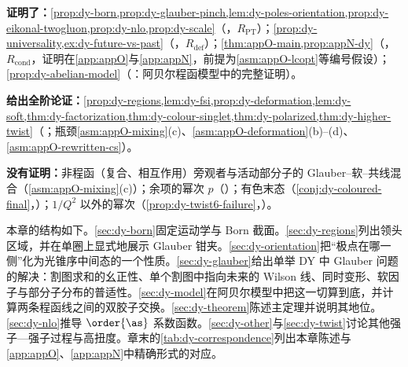 \begin{tcolorbox}[enhanced,breakable,title=本章证明了什么／没有证明什么,fonttitle=\bfseries,
  colback=gray!3!white,colframe=gray!55!black,boxrule=0.6pt,arc=2pt,
  left=5pt,right=5pt,top=3pt,bottom=3pt,before skip=6pt,after skip=6pt]
\textbf{证明了：}\cref{prop:dy-born,prop:dy-glauber-pinch,lem:dy-poles-orientation,prop:dy-eikonal-twogluon,prop:dy-nlo,prop:dy-scale}（\tagR，$R_{\mathrm{PT}}$）；\cref{prop:dy-universality,ex:dy-future-vs-past}（\tagR，$R_{\mathrm{def}}$）；\cref{thm:appO-main,prop:appN-dy}（\tagR，$R_{\mathrm{cond}}$，证明在\cref{app:appO}与\cref{app:appN}，前提为\cref{asm:appO-lcopt}等编号假设）；\cref{prop:dy-abelian-model}（\tagP：阿贝尔程函模型中的完整证明）。\par
\textbf{给出全阶论证：}\cref{prop:dy-regions,lem:dy-fsi,prop:dy-deformation,lem:dy-soft,thm:dy-factorization,thm:dy-colour-singlet,thm:dy-polarized,thm:dy-higher-twist}（\tagA；瓶颈\cref{asm:appO-mixing}(c)、\cref{asm:appO-deformation}(b)--(d)、\cref{asm:appO-rewritten-cs}）。\par
\textbf{没有证明：}非程函（复合、相互作用）旁观者与活动部分子的 Glauber--软--共线混合（\cref{asm:appO-mixing}(c)）；余项的幂次 $p$（\tagC）；有色末态（\cref{conj:dy-coloured-final}，\tagC）；$1/Q^2$ 以外的幂次（\cref{prop:dy-twist6-failure}，\tagV）。
\end{tcolorbox}

本章的结构如下。\cref{sec:dy-born}固定运动学与 Born 截面。\cref{sec:dy-regions}列出领头区域，并在单圈上显式地展示 Glauber 钳夹。\cref{sec:dy-orientation}把“极点在哪一侧”化为光锥序中间态的一个性质。\cref{sec:dy-glauber}给出单举 DY 中 Glauber 问题的解决：割图求和的幺正性、单个割图中指向未来的 Wilson 线、同时变形、软因子与部分子分布的普适性。\cref{sec:dy-model}在阿贝尔模型中把这一切算到底，并计算两条程函线之间的双胶子交换。\cref{sec:dy-theorem}陈述主定理并说明其地位。\cref{sec:dy-nlo}推导 $\order{\as}$ 系数函数。\cref{sec:dy-other}与\cref{sec:dy-twist}讨论其他强子—强子过程与高扭度。章末的\cref{tab:dy-correspondence}列出本章陈述与\cref{app:appO}、\cref{app:appN}中精确形式的对应。
